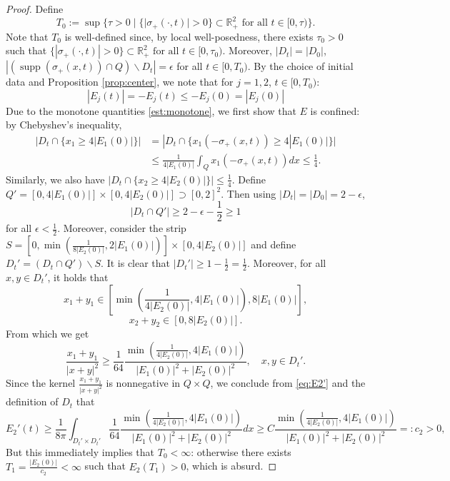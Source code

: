 \documentclass[11pt,reqno]{amsproc}
\newcommand{\eps}{\epsilon}
\newcommand{\R}{\mathbb{R}}
\DeclareMathOperator{\supp}{supp}
\begin{document}
\begin{proof}
    Define 
    $$
    T_0 := \sup\{\tau > 0\;|\; \{|\sigma_+(\cdot,t)| > 0\} \subset \R_+^2 \text{ for all } t\in [0,\tau)\}.
    $$
    Note that $T_0$ is well-defined since, by local well-posedness, there exists $\tau_0 > 0$ such that $\{|\sigma_+(\cdot,t)| > 0\} \subset \R_+^2 \text{ for all } t\in [0,\tau_0)$. Moreover, $|D_t| = |D_0|$, $|(\supp(\sigma_+(x,t))\cap Q)\backslash D_t| = \eps$ for all $t \in [0,T_0)$. By the choice of initial data and Proposition \ref{prop:center}, we note that for $j = 1,2$, $t \in [0,T_0)$:
    \begin{equation}\label{est:monotone}
    |E_j(t)| = -E_j(t) \le -E_j(0) = |E_j(0)|
    \end{equation}
    Due to the monotone quantities \eqref{est:monotone}, we first show that $E$ is confined: by Chebyshev's inequality,
    \begin{equation}\label{est:x1constraint}
    \begin{aligned}
    |D_t \cap \{x_1 \ge 4|E_1(0)|\}| &= |D_t \cap \{x_1(-\sigma_+(x,t)) \ge 4|E_1(0)|\}| \\
    &\le \frac{1}{4|E_1(0)|}\int_{Q} x_1(-\sigma_+(x,t)) dx \le \frac14.
    \end{aligned}
    \end{equation}
    Similarly, we also have $|D_t \cap \{x_2 \ge 4|E_2(0)|\}| \le \frac14$. Define $Q' = [0,4|E_1(0)|] \times [0,4|E_2(0)|] \supset [0,2]^2$. Then using $|D_t| = |D_0| = 2-\eps$,
    $$
    |D_t \cap Q'| \ge 2-\eps - \frac12\ge 1
    $$
    for all $\eps < \frac12$. Moreover, consider the strip $S = [0,\min(\frac{1}{8|E_2(0)| },2|E_1(0)|)] \times [0, 4|E_2(0)|]$ and define $D_t' = (D_t \cap Q') \backslash S$. It is clear that $|D_t'| \ge 1 - \frac12 = \frac12$. Moreover, for all $x, y \in D_t'$, it holds that
    $$
    x_1 + y_1 \in \left[\min(\frac{1}{4|E_2(0)|}, 4|E_1(0)|), 8|E_1(0)|\right],
    $$
    $$
    x_2 + y_2 \in [0,8|E_2(0)|].
    $$
    From which we get
    $$
    \frac{x_1 + y_1}{|x+y|^2} \ge \frac{1}{64}\frac{\min(\frac{1}{4|E_2(0)|}, 4|E_1(0)|)}{|E_1(0)|^2 + |E_2(0)|^2},\quad x,y \in D_t'.
    $$
    Since the kernel $\frac{x_1 + y_1}{|x+y|^2}$ is nonnegative in $Q\times Q$, we conclude from \eqref{eq:E2'} and the definition of $D_t$ that
    \begin{equation}\label{est:E2coercive}
    E_2'(t) \ge \frac{1}{8\pi}\int_{D_t' \times D_t'} \frac{1}{64}\frac{\min(\frac{1}{4|E_2(0)|}, 4|E_1(0)|)}{|E_1(0)|^2 + |E_2(0)|^2} dx \ge C\frac{\min(\frac{1}{4|E_2(0)|}, 4|E_1(0)|)}{|E_1(0)|^2 + |E_2(0)|^2} =: c_2> 0,
    \end{equation}
    But this immediately implies that $T_0 < \infty$: otherwise there exists $T_1 = \frac{|E_2(0)|}{c_2} < \infty$ such that $E_2(T_1) > 0$, which is absurd.


\end{proof}
\end{document}
